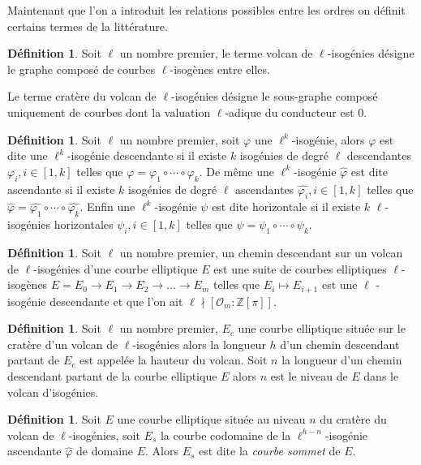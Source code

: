 \documentclass[10pt,a4paper]{book}
\theoremstyle{plain}
\theoremstyle{definition}
\theoremstyle{definition}
\theoremstyle{definition}
\theoremstyle{definition}
\newtheorem{defi}[thm]{Définition}
\theoremstyle{remark}
\theoremstyle{remark}
\theoremstyle{definition}
\begin{document}
Maintenant que l'on a introduit les relations possibles entre les ordres on définit certains termes de la littérature.

\begin{defi}
Soit $\ell$ un nombre premier, le terme volcan de $\ell$-isogénies désigne le graphe composé de courbes $\ell$-isogènes entre elles.

Le terme cratère du volcan de $\ell$-isogénies désigne le sous-graphe composé uniquement de courbes dont la valuation $\ell$-adique du conducteur est $0$.
\end{defi}

\begin{defi}
Soit $\ell$ un nombre premier, soit $\varphi$ une $\ell^k$-isogénie, alors
$\varphi$ est dite une $\ell^k$-isogénie descendante si il existe $k$ 
isogénies de degré $\ell$ descendantes $\varphi_i, i \in [1,k]$ telles que 
$\varphi=\varphi_1 \circ \cdots \circ \varphi_k$. De même une 
$\ell^k$-isogénie $\widehat{\varphi}$ est dite ascendante si il existe $k$ 
isogénies de degré $\ell$ ascendantes $\widehat{\varphi_i}, i \in [1,k]$ 
telles que $\widehat{\varphi}=\widehat{\varphi_1} \circ \cdots \circ 
\widehat{\varphi_k}$. Enfin une $\ell^k$-isogénie $\psi$ est dite horizontale 
si il existe $k$ $\ell$-isogénies horizontales $\psi_i, i \in [1,k]$ telles 
que $\psi=\psi_1 \circ \cdots \circ \psi_k$.
\end{defi}

\begin{defi}
Soit $\ell$ un nombre premier, un chemin descendant sur un volcan de $\ell$-isogénies d'une courbe elliptique $E$ est une suite de courbes elliptiques $\ell$-isogènes $E=E_0 \rightarrow E_1 \rightarrow E_2 \rightarrow ... \rightarrow E_m$ telles que $E_i \mapsto E_{i+1}$ est une $\ell$ -isogénie descendante et que l'on ait $\ell \nmid [ \mathcal{O}_m : \mathbb{Z}[\pi]]$. 
\end{defi}

\begin{defi}
Soit $\ell$ un nombre premier, $E_c$ une courbe elliptique située sur le cratère d'un volcan de $\ell$-isogénies alors la longueur $h$ d'un chemin descendant partant de $E_c$ est appelée la hauteur du volcan.
Soit $n$ la longueur d'un chemin descendant partant de la courbe elliptique $E$ alors $n$ est le niveau de $E$ dans le volcan d'isogénies.
\end{defi}

\begin{defi}
\label{def:cou:som}
Soit $E$ une courbe elliptique située au niveau $n$ du cratère du volcan de $\ell$-isogénies, soit $E_s$ la courbe codomaine de la $\ell^{h-n}$-isogénie ascendante $\widehat{\varphi}$ de domaine $E$. Alors $E_s$ est dite la \emph{courbe sommet} de $E$. 
\end{defi}
\end{document}

